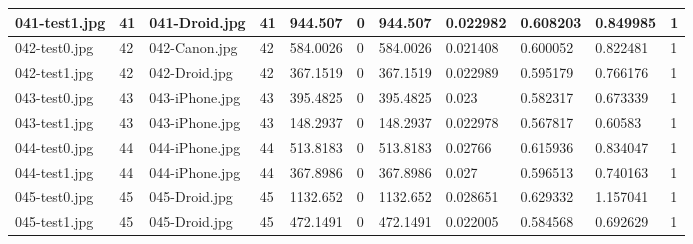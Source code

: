 \begin{landscape}
\begin{longtable}{|p{2cm}|p{1cm}|p{2cm}|p{1cm}|p{2cm}|p{1cm}|p{2cm}|p{2cm}|p{2cm}|p{2cm}|p{1cm}|}
		041-test1.jpg   & 41               & 041-Droid.jpg         & 41                          & 944.507               & 0                       & 944.507                    & 0.022982              & 0.608203              & 0.849985                 & 1                \\ \hline
		042-test0.jpg   & 42               & 042-Canon.jpg         & 42                          & 584.0026              & 0                       & 584.0026                   & 0.021408              & 0.600052              & 0.822481                 & 1                \\ \hline
		042-test1.jpg   & 42               & 042-Droid.jpg         & 42                          & 367.1519              & 0                       & 367.1519                   & 0.022989              & 0.595179              & 0.766176                 & 1                \\ \hline
		043-test0.jpg   & 43               & 043-iPhone.jpg        & 43                          & 395.4825              & 0                       & 395.4825                   & 0.023                 & 0.582317              & 0.673339                 & 1                \\ \hline
		043-test1.jpg   & 43               & 043-iPhone.jpg        & 43                          & 148.2937              & 0                       & 148.2937                   & 0.022978              & 0.567817              & 0.60583                  & 1                \\ \hline
		044-test0.jpg   & 44               & 044-iPhone.jpg        & 44                          & 513.8183              & 0                       & 513.8183                   & 0.02766               & 0.615936              & 0.834047                 & 1                \\ \hline
		044-test1.jpg   & 44               & 044-iPhone.jpg        & 44                          & 367.8986              & 0                       & 367.8986                   & 0.027                 & 0.596513              & 0.740163                 & 1                \\ \hline
		045-test0.jpg   & 45               & 045-Droid.jpg         & 45                          & 1132.652              & 0                       & 1132.652                   & 0.028651              & 0.629332              & 1.157041                 & 1                \\ \hline
		045-test1.jpg   & 45               & 045-Droid.jpg         & 45                          & 472.1491              & 0                       & 472.1491                   & 0.022005              & 0.584568              & 0.692629                 & 1                \\ \hline

\end{longtable}
\end{landscape}
